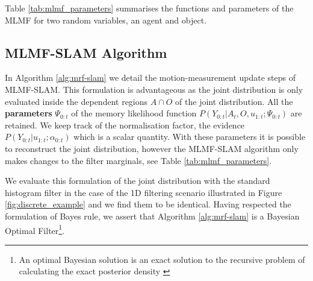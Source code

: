 Table \ref{tab:mlmf_parameters} summarises the functions and parameters of the MLMF for two random variables, an agent and object.
\begin{table}[h]
\centering
{}
\caption{MLMF functions with associated parameters. The marginal parameters are the discretisation of the 
state space $\boldsymbol{\theta} \in \mathbb{R}^N$, $\boldsymbol{\theta}^{(s)}$ correspond to the probability being in state $s$.}
\label{tab:mlmf_parameters}
\end{table}
\FloatBarrier
\subsection{MLMF-SLAM Algorithm}

In Algorithm \ref{alg:mrf-slam} we detail the motion-measurement update steps of MLMF-SLAM.
This formulation is advantageous as the joint distribution is only evaluated inside the dependent regions 
$A\cap O$ of the joint distribution. All the \textbf{parameters} $\Psi_{0:t}$ of the memory likelihood function
$P(Y_{0:t}|A_t,O,u_{1:t};\Psi_{0:t})$ are retained. We keep track of the normalisation factor, the evidence 
$P(Y_{0:t}|u_{1:t};\alpha_{0:t})$ which is a scalar quantity. 
With these parameters it is possible to reconstruct the joint distribution, however the MLMF-SLAM algorithm only
makes changes to the filter marginals, see Table \ref{tab:mlmf_parameters}. 

We evaluate this formulation of the joint distribution with the standard histogram filter in the case of the 1D filtering scenario
illustrated in Figure \ref{fig:discrete_example} and we find them to be identical. Having respected the formulation of Bayes rule, we
assert that Algorithm \ref{alg:mrf-slam} is a Bayesian Optimal Filter\footnote{An optimal Bayesian solution is an exact solution to the recursive problem of calculating the exact posterior density 
\cite{PF_tutorial_2002}}.


